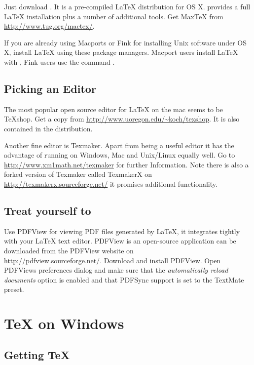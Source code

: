 Just download . It is a
pre-compiled LaTeX distribution for OS X.  provides a full LaTeX
installation plus a number of additional tools. Get MaxTeX from
\url{http://www.tug.org/mactex/}.

If you are already using Macports or Fink for installing Unix software under
OS X, install LaTeX using these package managers. Macport users install
LaTeX with ,
Fink users use the command .

\subsection{Picking an Editor}

The most popular open source editor for \LaTeX{} on the mac seems to be
\TeX{}shop.  Get a copy from \url{http://www.uoregon.edu/~koch/texshop}. It
is also contained in the  distribution.

Another fine editor is Texmaker. Apart from being a useful editor it has the
advantage of running on Windows, Mac and Unix/Linux equally well. Go to
\url{http://www.xm1math.net/texmaker} for further Information. Note there is
also a forked version of Texmaker called TexmakerX on
\url{http://texmakerx.sourceforge.net/} it promises additional functionality.

\subsection{Treat yourself to }

Use PDFView for viewing PDF files generated by LaTeX, it integrates tightly
with your LaTeX text editor. PDFView is an open-source application can be
downloaded from the PDFView website on\\
\url{http://pdfview.sourceforge.net/}. Download and install PDFView. Open
PDFViews preferences dialog and make sure that the \emph{automatically reload
documents} option is enabled and that PDFSync support is set to the TextMate
preset.

\section{\TeX{} on Windows}

\subsection{Getting \TeX{}}

